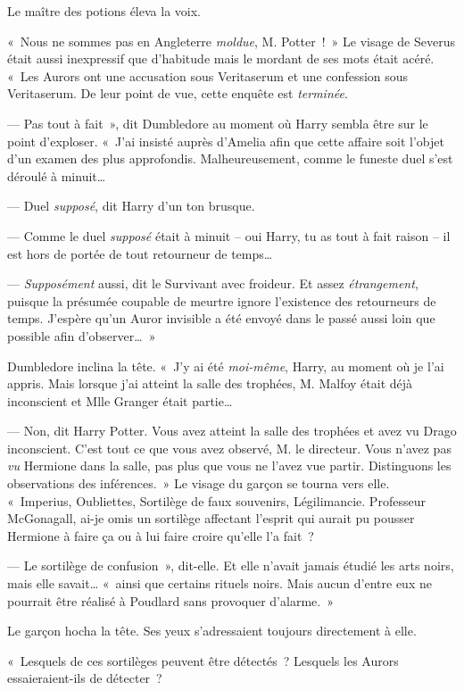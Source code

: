 Le maître des potions éleva la voix.

«~Nous ne sommes pas en Angleterre \emph{moldue}, M. Potter~!~»
Le visage de Severus était aussi inexpressif que d'habitude mais le mordant de ses mots était acéré.
«~Les Aurors ont une accusation sous Veritaserum et une confession sous Veritaserum.
De leur point de vue, cette enquête est \emph{terminée}.

--- Pas tout à fait~», dit Dumbledore au moment où Harry sembla être sur le point d'exploser.
«~J'ai insisté auprès d'Amelia afin que cette affaire soit l'objet d'un examen des plus approfondis.
Malheureusement, comme le funeste duel s'est déroulé à minuit…

--- Duel \emph{supposé}, dit Harry d'un ton brusque.

--- Comme le duel \emph{supposé} était à minuit -- oui Harry, tu as tout à fait raison -- il est hors de portée de tout retourneur de temps…

--- \emph{Supposément} aussi, dit le Survivant avec froideur.
Et assez \emph{étrangement}, puisque la présumée coupable de meurtre ignore l'existence des retourneurs de temps.
J'espère qu'un Auror invisible a été envoyé dans le passé aussi loin que possible afin d'observer…~»

Dumbledore inclina la tête.
«~J'y ai été \emph{moi-même}, Harry, au moment où je l'ai appris.
Mais lorsque j'ai atteint la salle des trophées, M. Malfoy était déjà inconscient et Mlle Granger était partie…

--- Non, dit Harry Potter.
Vous avez atteint la salle des trophées et avez vu Drago inconscient.
C'est tout ce que vous avez observé, M. le directeur.
Vous n'avez pas \emph{vu} Hermione dans la salle, pas plus que vous ne l'avez vue partir.
Distinguons les observations des inférences.~»
Le visage du garçon se tourna vers elle.
«~Imperius, Oubliettes, Sortilège de faux souvenirs, Légilimancie.
Professeur McGonagall, ai-je omis un sortilège affectant l'esprit qui aurait pu pousser Hermione à faire ça ou à lui faire croire qu'elle l'a fait~?

--- Le sortilège de confusion~», dit-elle.
Et elle n'avait jamais étudié les arts noirs, mais elle savait…
«~ainsi que certains rituels noirs.
Mais aucun d'entre eux ne pourrait être réalisé à Poudlard sans provoquer d'alarme.~»

Le garçon hocha la tête.
Ses yeux s'adressaient toujours directement à elle.

«~Lesquels de ces sortilèges peuvent être détectés~?
Lesquels les Aurors essaieraient-ils de détecter~?

